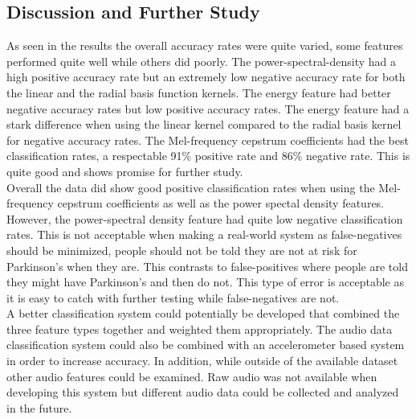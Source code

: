 \documentclass[twoside]{article}
\begin{document}
\newpage
\begin{multicols}{2}

\section{Discussion and Further Study}

As seen in the results the overall accuracy rates were quite varied, some features
performed quite well while others did poorly. The power-spectral-density had a high positive
accuracy rate but an extremely low negative accuracy rate for both the linear and the radial
basis function kernels. The energy feature had better negative accuracy rates but low 
positive accuracy rates. The energy feature had a stark difference when using the linear
kernel compared to the radial basis kernel for negative accuracy rates. The Mel-frequency cepstrum
coefficients had the best classification rates, a respectable 91\% positive rate and 86\%
negative rate. This is quite good and shows promise for further study.\\
Overall the data did show good positive classification rates when using the Mel-frequency cepstrum
coefficients as well as the power spectal density features. However, the power-spectral density feature had
quite low negative classification rates. This is not acceptable when making a real-world system
as false-negatives should be minimized, people should not be told they are not at risk for Parkinson's
when they are. This contrasts to false-positives where people are told they might have Parkinson's and
then do not. This type of error is acceptable as it is easy to catch with further testing while
false-negatives are not.\\
A better classification system could potentially be developed that combined the three
feature types together and weighted them appropriately. The audio data classification system could
also be combined with an accelerometer based system in order to increase accuracy. In addition, while 
outside of the available dataset other audio features could be examined. Raw audio was not available
when developing this system but different audio data could be collected and analyzed in the future.



\end{multicols}
\end{document}
